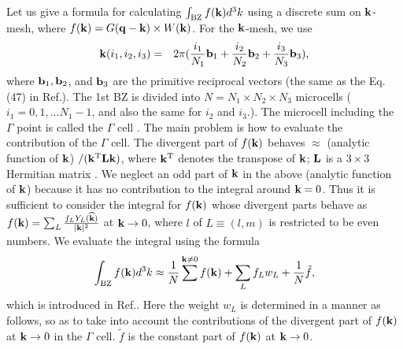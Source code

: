 \documentclass[a4paper,10pt,fleqn]{article}
\newcommand{\bfq}{{\bf q}}
\newcommand{\bfk}{{\bf k}}
\begin{document}
Let us give a formula for calculating
$\int_{\rm BZ} f(\bfk) d^3k$ using a discrete sum on $\bfk$-mesh,
where $f(\bfk)=G(\bfq-\bfk) \times W(\bfk)$.
For the $\bfk$-mesh, we use
\begin{eqnarray}
{\bf k}(i_1,i_2,i_3) &=& 2 \pi (\frac{i_1}{N_1} {\bf b}_1 
+ \frac{i_2}{N_2} {\bf b}_2 + \frac{i_3}{N_3} {\bf b}_3),
\label{kmesh}
\nonumber
\end{eqnarray}
where ${\bf b}_1, {\bf b}_2$, and ${\bf b}_3$ are the primitive reciprocal
vectors (the same as the Eq.(47) in Ref.\cite{kotani_quasiparticle_2007}). 
The 1st BZ is divided into $N=N_1 \times N_2 \times N_3$
microcells ($i_1=0,1,... N_1-1$, and also the same for $i_2$ and $i_3$.).
The microcell including the $\Gamma$ point is called the
$\Gamma$ cell \cite{freysoldt_dielectric_2007}.
The main problem is how to evaluate the contribution of the $\Gamma$ cell.
The divergent part of $f(\bfk)$ behaves $\approx$ (analytic function of $\bfk$) 
$/(\bfk^{\rm T}{\bf L}\bfk)$, 
where $\bfk^{\rm T}$ denotes the transpose of $\bfk$; ${\bf L}$
is a $3\times3$ Hermitian matrix \cite{friedrich_efficient_2010}. 
We neglect an odd part of $\bfk$ in the above (analytic function of $\bfk$)
because it has no contribution to the integral around $\bfk=0$.
Thus it is sufficient to consider the integral for $f(\bfk)$ whose divergent parts behave
as $f(\bfk)=\sum_L \frac{f_L Y_L(\widehat{\bfk})}{|\bfk|^2}$ at $\bfk \to 0$, 
where $l$ of $L\equiv(l,m)$ is restricted to be even numbers.
We evaluate the integral using the formula
\begin{eqnarray}
\int_{\rm BZ} f(\bfk) d^3k \approx \frac{1}{N}\sum^{\bfk \ne 0} f(\bfk)
 + \sum_L f_L w_L + \frac{1}{N} \tilde{f},
\label{eq:bzint0}
\end{eqnarray}
which is introduced in Ref.\cite{freysoldt_dielectric_2007}. 
Here the weight $w_L$ is determined in a manner as follows,
so as to take into account the contributions of 
the divergent part of $f(\bfk)$ at $\bfk \to 0$ in the $\Gamma$ cell.
$\tilde{f}$ is the constant part of $f(\bfk)$ at $\bfk \to 0$.
\end{document}

